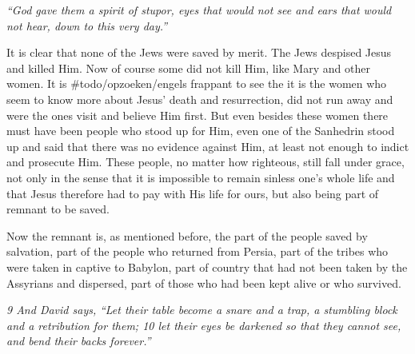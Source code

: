 \emph{``God gave them a spirit of stupor,\emph{ }eyes that would not
see\emph{ }and ears that would not hear,\emph{ }down to this very
day.''}

It is clear that none of the Jews were saved by merit. The Jews despised
Jesus and killed Him. Now of course some did not kill Him, like Mary and
other women. It is \#todo/opzoeken/engels frappant to see the it is the
women who seem to know more about Jesus' death and resurrection, did not
run away and were the ones visit and believe Him first. But even besides
these women there must have been people who stood up for Him, even one
of the Sanhedrin stood up and said that there was no evidence against
Him, at least not enough to indict and prosecute Him. These people, no
matter how righteous, still fall under grace, not only in the sense that
it is impossible to remain sinless one's whole life and that Jesus
therefore had to pay with His life for ours, but also being part of
remnant to be saved.

Now the remnant is, as mentioned before, the part of the people saved by
salvation, part of the people who returned from Persia, part of the
tribes who were taken in captive to Babylon, part of country that had
not been taken by the Assyrians and dispersed, part of those who had
been kept alive or who survived.

\emph{9 And David says,} \emph{``Let their table become a snare and a
trap,\emph{ }a stumbling block and a retribution for them;\emph{ }10 let
their eyes be darkened so that they cannot see,\emph{ }and bend their
backs forever.''}

